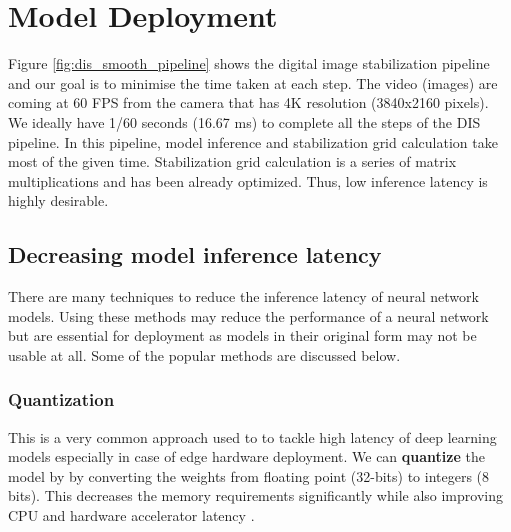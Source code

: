 







\section{Model Deployment}
\label{sec:model_deployment}
Figure \ref{fig:dis_smooth_pipeline} shows the digital image stabilization pipeline and our goal is to minimise the time taken at each step. The video (images) are coming at 60 FPS from the camera that has 4K resolution (3840x2160 pixels). We ideally have 1/60 seconds (16.67 ms) to complete all the steps of the DIS pipeline. In this pipeline, model inference and stabilization grid calculation take most of the given time. Stabilization grid calculation is a series of matrix multiplications and has been already optimized. Thus, low inference latency is highly desirable.

\subsection{Decreasing model inference latency}
There are many techniques to reduce the inference latency of neural network models. Using these methods may reduce the performance of a neural network but are essential for deployment as models in their original form may not be usable at all. Some of the popular methods are discussed below.

\subsubsection{Quantization}
This is a very common approach used to to tackle high latency of deep learning models especially in case of edge hardware deployment. We can \textbf{quantize} the model by by converting the weights from floating point (32-bits) to integers (8 bits). This decreases the memory requirements significantly while also improving CPU and hardware accelerator latency \citep{FastModels}. 

